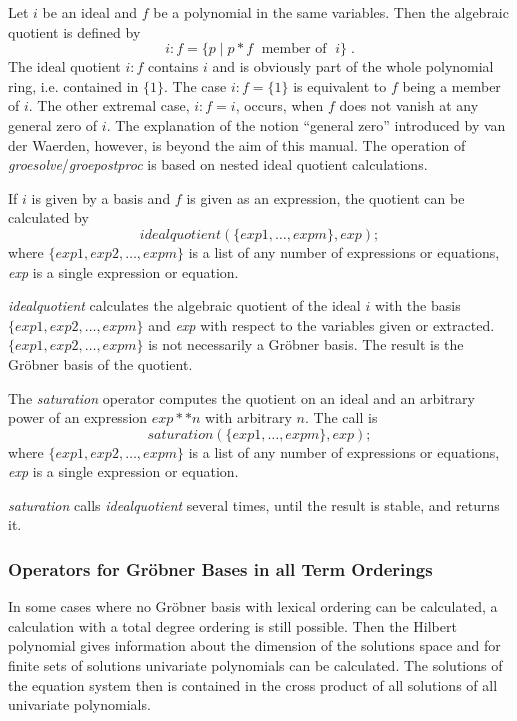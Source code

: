  
Let $i$ be an ideal and $f$ be a polynomial in the same
variables. Then the algebraic quotient is defined by
\[
i:f = \{ p \;| \; p * f \;\mbox{    member of }\; i\}\;.
\]
The ideal quotient $i:f$ contains $i$ and is obviously part of the
whole polynomial ring, i.e. contained in $\{1\}$. The case $i:f =
\{1\}$ is equivalent to $f$ being a member of  $i$. The other extremal
case, $i:f=i$, occurs, when $f$ does not vanish at any general zero of $i$.
The explanation of the notion ``general zero'' introduced by van der
Waerden, however, is beyond the aim of this manual. The operation
of \emph{groesolve}/\emph{groepostproc} is based on nested ideal quotient
calculations.

If $i$ is given by a basis and $f$ is given as an expression, the
quotient can be calculated by
\[
idealquotient (\{exp1, \ldots , expm\}, exp); \]
where $\{exp1, exp2, \ldots , expm\}$ is a list of any number of
expressions or equations, {\it exp} is a single expression or equation.

\emph{idealquotient} calculates the algebraic quotient of the ideal $i$
with the basis  $\{exp1, exp2, \ldots , expm\}$ and {\it exp} with
respect to  the variables given or extracted.  $\{exp1, exp2, \ldots ,
expm\}$ is not necessarily a Gr\"obner basis.
The result is the Gr\"obner basis of the quotient.

The \emph{saturation} operator computes the quotient on an ideal and an arbitrary power
of an expression $exp**n$ with arbitrary $n$. The call is
\[ saturation (\{exp1, \ldots , expm\}, exp); \]
where $\{exp1, exp2, \ldots , expm\}$ is a list of any number of
expressions or equations, {\it exp} is a single expression or equation.

\emph{saturation} calls \emph{idealquotient} several times, until the result is
stable, and returns it.

\subsubsection{Operators for Gr\"obner Bases in all Term Orderings}
In some cases where no Gr\"obner
basis with lexical ordering can be calculated, a calculation with a total
degree ordering is still possible. Then the Hilbert polynomial gives
information about the dimension of the solutions space and for finite
sets of solutions univariate polynomials can be calculated. The solutions
of the equation system then is contained in the cross product of all
solutions of all univariate polynomials.

